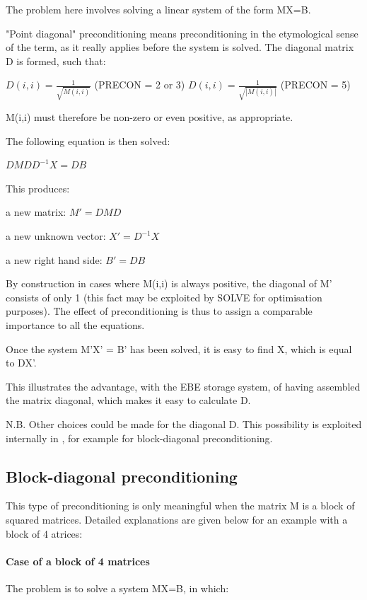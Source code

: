 The problem here involves solving a linear system of the form MX=B.

"Point diagonal" preconditioning means preconditioning in the etymological
sense of the term, as it really applies before the system is solved. The
diagonal matrix D is formed, such that:

$D(i,i)=\frac{1}{\sqrt{M(i,i)} } $ (PRECON = 2 or 3)
$D(i,i)=\frac{1}{\sqrt{\left|M(i,i)\right|} } $   (PRECON = 5)

M(i,i) must therefore be non-zero or even positive, as appropriate.

The following equation is then solved:

$DMDD^{-1}X  =  DB$

This produces:

a new matrix: $M' = DMD$

a new unknown vector: $X' = D^{-1}X$

a new right hand side: $B' = DB$

By construction in cases where M(i,i) is always positive, the diagonal of M'
consists of only 1 (this fact may be exploited by SOLVE for optimisation
purposes). The effect of preconditioning is thus to assign a comparable
importance to all the equations.

Once the system M'X' = B' has been solved, it is easy to find X, which is equal
to DX'.

This illustrates the advantage, with the EBE storage system, of having
assembled the matrix diagonal, which makes it easy to calculate D.

N.B. Other choices could be made for the diagonal D. This possibility is
exploited internally in \bief, for example for block-diagonal preconditioning.

\subsection{Block-diagonal preconditioning}

This type of preconditioning is only meaningful when the matrix M is a block of
squared matrices. Detailed explanations are given below for an example with a
block of 4 atrices:




\paragraph{Case of a block of 4 matrices}

The problem is to solve a system MX=B, in which:

